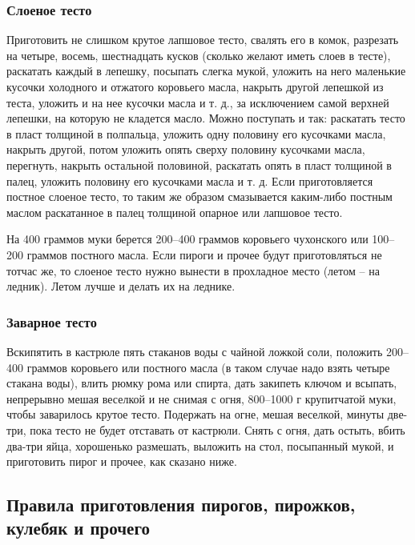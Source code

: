 \subsubsection{Слоеное тесто}\label{sub:slojonoje}

Приготовить не слишком крутое лапшовое тесто, свалять его в комок, разрезать на четыре, восемь, шестнадцать кусков (сколько желают иметь слоев в тесте), раскатать каждый в лепешку, посыпать слегка мукой, уложить на него маленькие кусочки холодного и отжатого коровьего масла, накрыть другой лепешкой из теста, уложить и на нее кусочки масла и т. д., за исключением самой верхней лепешки, на которую не кладется масло. Можно поступать и так: раскатать тесто в пласт толщиной в полпальца, уложить одну половину его кусочками масла, накрыть другой, потом уложить опять сверху половину кусочками масла, перегнуть, накрыть остальной половиной, раскатать опять в пласт толщиной в палец, уложить половину его кусочками масла и т. д. Если приготовляется постное слоеное тесто, то таким же образом смазывается каким-либо постным маслом раскатанное в палец толщиной опарное или лапшовое тесто.

На 400 граммов муки берется 200–400 граммов коровьего чухонского или 100–200 граммов постного масла. Если пироги и прочее будут приготовляться не тотчас же, то слоеное тесто нужно вынести в прохладное место (летом – на ледник). Летом лучше и делать их на леднике.

\subsubsection{Заварное тесто}\label{sub:zavarnoje}

Вскипятить в кастрюле пять стаканов воды с чайной ложкой соли, положить 200–400 граммов коровьего или постного масла (в таком случае надо взять четыре стакана воды), влить рюмку рома или спирта, дать закипеть ключом и всыпать, непрерывно мешая веселкой и не снимая с огня, 800–1000 г крупитчатой муки, чтобы заварилось крутое тесто. Подержать на огне, мешая веселкой, минуты две-три, пока тесто не будет отставать от кастрюли. Снять с огня, дать остыть, вбить два-три яйца, хорошенько размешать, выложить на стол, посыпанный мукой, и приготовить пирог и прочее, как сказано ниже.

\subsection*{Правила приготовления пирогов, пирожков, кулебяк и прочего} \label{sec:obschie-kulebiaki}

